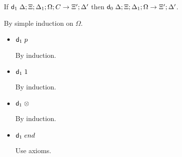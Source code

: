 If $\mathsf{d}_1 \; \Delta; \Xi; \Delta_1; \Omega; C \rightarrow \Xi'; \Delta'$ then $\mathsf{d}_0 \; \Delta; \Xi; \Delta_1; \Omega \rightarrow \Xi'; \Delta'$.

By simple induction on $\Omega$.

\begin{itemize}
   \item $\mathsf{d}_1 \; p$
   
   By induction.
   
   \item $\mathsf{d}_1 \; 1$
   
   By induction.
   
   \item $\mathsf{d}_1 \; \otimes$
   
   By induction.
   
   \item $\mathsf{d}_1 \; end$
   
   Use axioms.
   
\end{itemize}